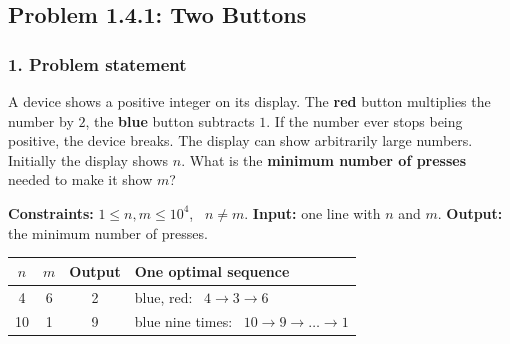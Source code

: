 \subsection{Problem 1.4.1: Two Buttons}


\subsubsection*{1. Problem statement}

A device shows a positive integer on its display. The \textbf{red} button multiplies the number by $2$, the \textbf{blue} button subtracts $1$. If the number ever stops being positive, the device breaks. The display can show arbitrarily large numbers. Initially the display shows $n$. What is the \textbf{minimum number of presses} needed to make it show $m$?

\textbf{Constraints:} $1 \le n, m \le 10^4$, \ $n \ne m$. \quad \textbf{Input:} one line with $n$ and $m$. \quad \textbf{Output:} the minimum number of presses.

\begin{table}[H]
\centering\small
\begin{tabular}{@{}cccl@{}}
\toprule
$n$ & $m$ & \textbf{Output} & \textbf{One optimal sequence} \\
\midrule
4 & 6 & 2 & blue, red: \ $4 \to 3 \to 6$ \\
10 & 1 & 9 & blue nine times: \ $10 \to 9 \to \dots \to 1$ \\
\bottomrule
\end{tabular}
\end{table}

